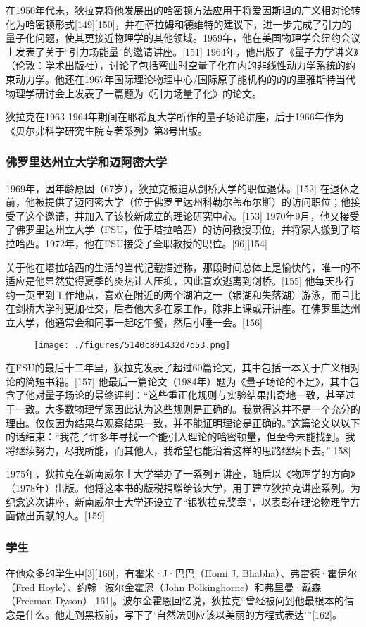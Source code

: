 在1950年代末，狄拉克将他发展出的哈密顿方法应用于将爱因斯坦的广义相对论转化为哈密顿形式[149][150]，并在萨拉姆和德维特的建议下，进一步完成了引力的量子化问题，使其更接近物理学的其他领域。1959年，他在美国物理学会纽约会议上发表了关于“引力场能量”的邀请讲座。[151] 1964年，他出版了《量子力学讲义》（伦敦：学术出版社），讨论了包括弯曲时空量子化在内的非线性动力学系统的约束动力学。他还在1967年国际理论物理中心/国际原子能机构的的的里雅斯特当代物理学研讨会上发表了一篇题为《引力场量子化》的论文。

狄拉克在1963-1964年期间在耶希瓦大学所作的量子场论讲座，后于1966年作为《贝尔弗科学研究生院专著系列》第3号出版。
\subsubsection{佛罗里达州立大学和迈阿密大学}
1969年，因年龄原因（67岁），狄拉克被迫从剑桥大学的职位退休。[152] 在退休之前，他被提供了迈阿密大学（位于佛罗里达州科勒尔盖布尔斯）的访问职位；他接受了这个邀请，并加入了该校新成立的理论研究中心。[153] 1970年9月，他又接受了佛罗里达州立大学（FSU，位于塔拉哈西）的访问教授职位，并将家人搬到了塔拉哈西。1972年，他在FSU接受了全职教授的职位。[96][154]

关于他在塔拉哈西的生活的当代记载描述称，那段时间总体上是愉快的，唯一的不适应是他显然觉得夏季的炎热让人压抑，因此喜欢逃离到剑桥。[155] 他每天步行约一英里到工作地点，喜欢在附近的两个湖泊之一（银湖和失落湖）游泳，而且比在剑桥大学时更加社交，后者他大多在家工作，除非上课或开讲座。在佛罗里达州立大学，他通常会和同事一起吃午餐，然后小睡一会。[156]
\begin{figure}[ht]
\centering
\texttt{[image: ./figures/5140c801432d7d53.png]}
\caption{} \label{fig_DLK1_6}
\end{figure}
在FSU的最后十二年里，狄拉克发表了超过60篇论文，其中包括一本关于广义相对论的简短书籍。[157] 他最后一篇论文（1984年）题为《量子场论的不足》，其中包含了他对量子场论的最终评判：“这些重正化规则与实验结果出奇地一致，甚至过于一致。大多数物理学家因此认为这些规则是正确的。我觉得这并不是一个充分的理由。仅仅因为结果与观察结果一致，并不能证明理论是正确的。”这篇论文以以下的话结束：“我花了许多年寻找一个能引入理论的哈密顿量，但至今未能找到。我将继续努力，尽我所能，而其他人，我希望也能沿着这样的思路继续下去。”[158]

1975年，狄拉克在新南威尔士大学举办了一系列五讲座，随后以《物理学的方向》（1978年）出版。他将这本书的版税捐赠给该大学，用于建立狄拉克讲座系列。为纪念这次讲座，新南威尔士大学还设立了“银狄拉克奖章”，以表彰在理论物理学方面做出贡献的人。[159]
\subsubsection{学生}  
在他众多的学生中[3][160]，有霍米·J·巴巴（Homi J. Bhabha）、弗雷德·霍伊尔（Fred Hoyle）、约翰·波尔金霍恩（John Polkinghorne）和弗里曼·戴森（Freeman Dyson）[161]。波尔金霍恩回忆说，狄拉克“曾经被问到他最根本的信念是什么。他走到黑板前，写下了‘自然法则应该以美丽的方程式表达’”[162]。
